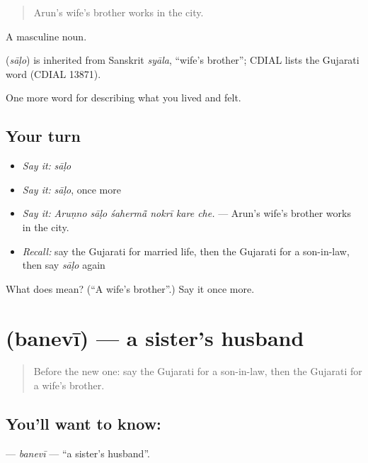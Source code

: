 \begin{quote}
Arun's wife's brother works in the city.
\end{quote}

A masculine noun.

\begin{cousinweb}
\textbf{} (\emph{sāḷo}) is inherited from Sanskrit \emph{syāla}, \textquotedblleft{}wife's brother\textquotedblright{}; CDIAL lists the Gujarati word (CDIAL 13871).
\end{cousinweb}

\begin{grammarlens}[title={What you've built}]
One more word for describing what you lived and felt.
\end{grammarlens}

\subsection*{Your turn}
\begin{itemize}
\raggedright
  \item \emph{Say it:} \emph{sāḷo}
  \item \emph{Say it:} \emph{sāḷo}, once more
  \item \emph{Say it:} \emph{Aruṇno sāḷo śahermā̃ nokrī kare che.} — Arun's wife's brother works in the city.
  \item \emph{Recall:} say the Gujarati for married life, then the Gujarati for a son-in-law, then say \emph{sāḷo} again
\end{itemize}

\begin{tcolorbox}[breakable,colback=teal!4,colframe=teal!35!black,title={Before you move on}]
What does  mean? (\textquotedblleft{}A wife's brother\textquotedblright{}.) Say it once more.
\end{tcolorbox}
\section[\texorpdfstring{\gu{બનેવી} (banevī)}{બનેવી (banevī)}]{ (banevī) — a sister's husband}

\label{lesson:GU-C491-banevi}



\begin{quote}
Before the new one: say the Gujarati for a son-in-law, then the Gujarati for a wife's brother.
\end{quote}

\subsection*{You'll want to know: }
\textbf{} — \emph{banevī} — \textquotedblleft{}a sister's husband\textquotedblright{}.

